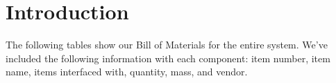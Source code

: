 \documentclass[]{auvsi_doc}
\begin{document}
	
	\begin{AUVSITitlePage}
		\begin{artifacttable}
		\end{artifacttable}
	\end{AUVSITitlePage}
	
	\section{Introduction}
	The following tables show our Bill of Materials for the entire system. We've included the following information with each component: item number, item name, items interfaced with, quantity, mass, and vendor.
	
	
\end{document}
